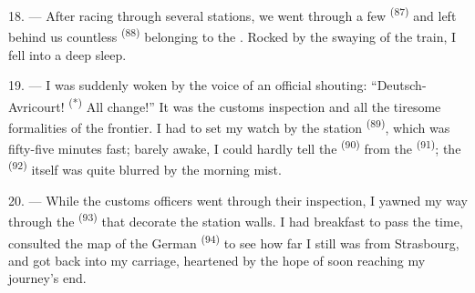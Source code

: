 18. --- After racing through several stations, we went through a few
 \textsuperscript{(87)} and left behind us countless
 \textsuperscript{(88)} belonging to the .
Rocked by the swaying of the train, I fell into a deep sleep.

\VUsaut{3.0mm}
\VUsaut{3.0mm}

19. --- I was suddenly woken by the voice of an official shouting:
“Deutsch-Avricourt! \textsuperscript{(*)} All change!” It was the customs
inspection and all the tiresome formalities of the frontier. I had to set
my watch by the station  \textsuperscript{(89)}, which was fifty-five
minutes fast; barely awake, I could hardly tell the 
\textsuperscript{(90)} from the  \textsuperscript{(91)}; the 
\textsuperscript{(92)} itself was quite blurred by the morning mist.

20. --- While the customs officers went through their inspection, I
yawned my way through the  \textsuperscript{(93)} that decorate the
station walls. I had breakfast to pass the time, consulted the map of the
German  \textsuperscript{(94)} to see how far I still was from
Strasbourg, and got back into my carriage, heartened by the hope of soon
reaching my journey's end.
\VUsaut{6.0mm}
\VUfilet{22mm}
